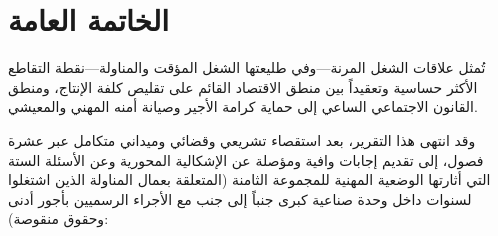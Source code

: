 
\chapter*{الخاتمة العامة}

تُمثل علاقات الشغل المرنة—وفي طليعتها الشغل المؤقت والمناولة—نقطة التقاطع الأكثر حساسية وتعقيداً بين منطق الاقتصاد القائم على تقليص كلفة الإنتاج، ومنطق القانون الاجتماعي الساعي إلى حماية كرامة الأجير وصيانة أمنه المهني والمعيشي.

وقد انتهى هذا التقرير، بعد استقصاء تشريعي وقضائي وميداني متكامل عبر عشرة فصول، إلى تقديم إجابات وافية ومؤصلة عن الإشكالية المحورية وعن الأسئلة الستة التي أثارتها الوضعية المهنية للمجموعة الثامنة (المتعلقة بعمال المناولة الذين اشتغلوا لسنوات داخل وحدة صناعية كبرى جنباً إلى جنب مع الأجراء الرسميين بأجور أدنى وحقوق منقوصة):


